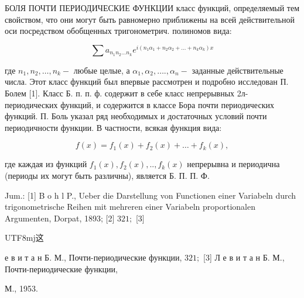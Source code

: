 \documentclass[10pt]{article}
\begin{document}
БОЛЯ ПОЧТИ ПЕРИОДИЧЕСКИЕ ФУНКЦИИ класс функций, определяемый тем свойством, что они могут быть равномерно приближены на всей действительной оси посредством обобщенных тригонометрич. полиномов вида:



\[

\sum a_{n_{1} n_{2} \ldots n_{k}} e^{i\left(n_{1} \alpha_{1}+n_{2} \alpha_{2}+\ldots+n_{k} \alpha_{k}\right) x}

\]



где $n_{1}, n_{2}, \ldots, n_{k}-$ любые целые, а $\alpha_{1}, \alpha_{2}, \ldots ., \alpha_{n}-$ заданные действительные числа. Этот класс функций был впервые рассмотрен и подробно исследован П. Болем [1]. Класс Б. п. п. ф. содержит в себе класс непрерывных 2л-периодических функций, и содержится в классе Бора почти периодических функций. П. Боль указал ряд необходимых и достаточных условий почти периодичности функции. В частности, всякая функция вида:



\[

f(x)=f_{1}(x)+f_{2}(x)+\ldots+f_{k}(x),

\]



где каждая из функций $f_{1}(x), f_{2}(x), . ., f_{k}(x)$ непрерывна и периодична (периоды их могут быть различны), является Б. П. П. Ф.



Jum.: [1] B o h l P., Ueber die Darstellung von Functionen einer Variabeln durch trigonometrische Reihen mit mehreren einer Variabeln proportionalen Argumenten, Dorpat, 1893; [2] $321 ;$ [3] \begin{CJK}{UTF8}{mj}这\end{CJK} е в и т а н Б. М., Почти-периодические функции, $321 ;$ [3] Л е в и т а н Б. М., Почти-периодические функции,

М., 1953.
\end{document}
